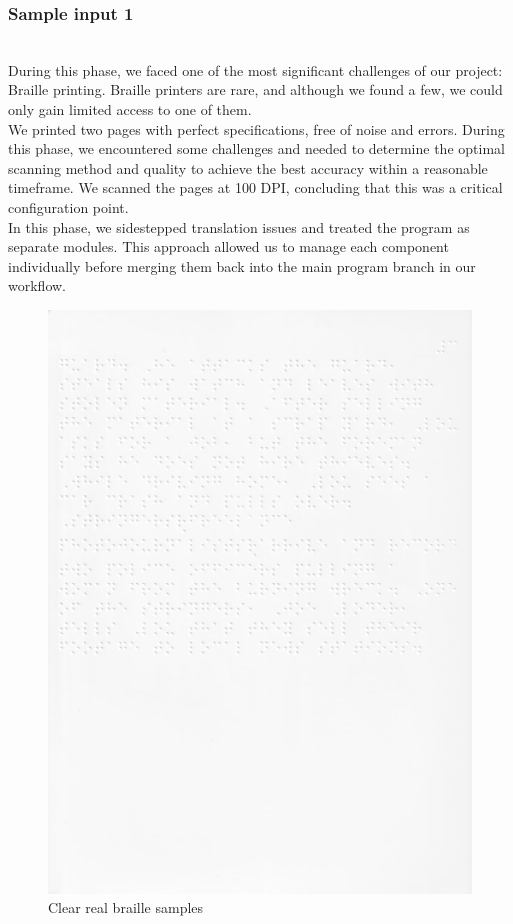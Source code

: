 \hypertarget{Sample input 1}{%
\subsubsection{Sample input 1}\label{Sample input 1}}
\vspace{1em}\\
\quad During this phase, we faced one of the most significant challenges of
our project: Braille printing. Braille printers are rare, and although
we found a few, we could only gain limited access to one of them.\\

\quad We printed two pages with perfect specifications, free of noise and
errors. During this phase, we encountered some challenges and needed to
determine the optimal scanning method and quality to achieve the best
accuracy within a reasonable timeframe. We scanned the pages at 100 DPI,
concluding that this was a critical configuration point.\\

\quad In this phase, we sidestepped translation issues and treated the
program as separate modules. This approach allowed us to manage each
component individually before merging them back into the main program
branch in our workflow.\\
\clearpage
\begin{figure}[h!]
     \centering
         \centering
         \includegraphics[width=.8\textwidth]{image5.jpg}
        \caption{Clear real braille samples}
        \label{fig:Clear real braille samples}
\end{figure}\\

